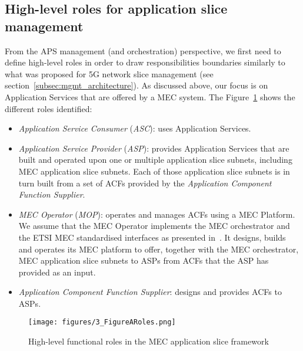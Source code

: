 \subsection{High-level roles for application slice management}
\label{subsec:roles}
\noindent
From the APS management (and orchestration) perspective, we first need to define high-level roles in order to draw responsibilities boundaries similarly to what was proposed for 5G network slice management (see section~\ref{subsec:mgmt_architecture}). As discussed above, our focus is on Application Services that are offered by a MEC system. The Figure~\ref{fig:AS_roles} shows the different roles identified:
%
\renewcommand\labelitemi{$\bullet$}
\begin{itemize}[noitemsep,topsep=2pt]
    \item \textit{Application Service Consumer} (\textit{ASC}): uses Application Services.
    \item \textit{Application Service Provider} (\textit{ASP}): provides Application Services that are built and operated upon one or multiple application slice subnets, including MEC application slice subnets. Each of those application slice subnets is in turn built from a set of ACFs provided by the \emph{Application Component Function Supplier}.
    \item \textit{MEC Operator} (\textit{MOP}): operates and manages ACFs using a MEC Platform. We assume that the MEC Operator implements the MEC orchestrator and the ETSI MEC standardised interfaces as presented in~\cite{MEC003}. It designs, builds and operates its MEC platform to offer, together with the MEC orchestrator, MEC application slice subnets to ASPs from ACFs that the ASP has provided as an input.
    \item \textit{Application Component Function Supplier}: designs and provides ACFs to ASPs.
\end{itemize}
%
\begin{figure}[t]
\centering
\texttt{[image: figures/3\_FigureARoles.png]}
\caption{High-level functional roles in the MEC application slice framework}
\label{fig:AS_roles}
\end{figure}
%
